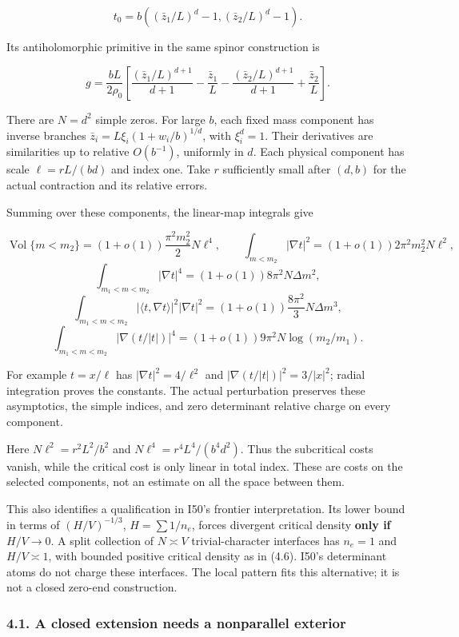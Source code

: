 \documentclass[
  10pt,
]{article}
\begin{document}
\[
 t_0=b((\bar z_1/L)^d-1,(\bar z_2/L)^d-1).
 \tag{4.1}
\]

Its antiholomorphic primitive in the same spinor construction is

\[
 g=\frac{bL}{2\rho_0}\left[
 \frac{(\bar z_1/L)^{d+1}}{d+1}-\frac{\bar z_1}{L}
 -\frac{(\bar z_2/L)^{d+1}}{d+1}+\frac{\bar z_2}{L}\right].
 \tag{4.2}
\]

There are \(N=d^2\) simple zeros. For large \(b\), each fixed mass
component has inverse branches \(\bar z_i=L\xi_i(1+w_i/b)^{1/d}\), with
\(\xi_i^d=1\). Their derivatives are similarities up to relative
\(O(b^{-1})\), uniformly in \(d\). Each physical component has scale
\(\ell=rL/(bd)\) and index one. Take \(r\) sufficiently small after
\((d,b)\) for the actual contraction and its relative errors.

Summing over these components, the linear-map integrals give

\[
 \operatorname{Vol}\{m<m_2\}
 =(1+o(1))\frac{\pi^2m_2^2}{2}N\ell^4,\qquad
 \int_{m<m_2}|\nabla t|^2
 =(1+o(1))2\pi^2m_2^2N\ell^2,
 \tag{4.3}
\] \[
 \int_{m_1<m<m_2}|\nabla t|^4
 =(1+o(1))8\pi^2N\Delta m^2,
 \tag{4.4}
\] \[
 \int_{m_1<m<m_2}|\langle t,\nabla t\rangle|^2|\nabla t|^2
 =(1+o(1))\frac{8\pi^2}{3}N\Delta m^3,
 \tag{4.5}
\] \[
 \int_{m_1<m<m_2}|\nabla(t/|t|)|^4
 =(1+o(1))9\pi^2N\log(m_2/m_1).
 \tag{4.6}
\]

For example \(t=x/\ell\) has \(|\nabla t|^2=4/\ell^2\) and
\(|\nabla(t/|t|)|^2=3/|x|^2\); radial integration proves the constants.
The actual perturbation preserves these asymptotics, the simple indices,
and zero determinant relative charge on every component.

Here \(N\ell^2=r^2L^2/b^2\) and \(N\ell^4=r^4L^4/(b^4d^2)\). Thus the
subcritical costs vanish, while the critical cost is only linear in
total index. These are costs on the selected components, not an estimate
on all the space between them.

This also identifies a qualification in I50's frontier interpretation.
Its lower bound in terms of \((H/V)^{-1/3}\), \(H=\sum1/n_e\), forces
divergent critical density \textbf{only if \(H/V\to0\)}. A split
collection of \(N\asymp V\) trivial-character interfaces has \(n_e=1\)
and \(H/V\asymp1\), with bounded positive critical density as in (4.6).
I50's determinant atoms do not charge these interfaces. The local
pattern fits this alternative; it is not a closed zero-end construction.

\hypertarget{a-closed-extension-needs-a-nonparallel-exterior}{%
\subsubsection{4.1. A closed extension needs a nonparallel
exterior}\label{a-closed-extension-needs-a-nonparallel-exterior}}
\end{document}
